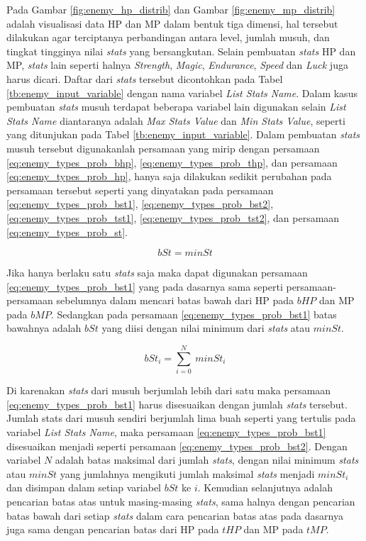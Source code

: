 Pada Gambar \ref{fig:enemy_hp_distrib} dan Gambar \ref{fig:enemy_mp_distrib} adalah visualisasi data HP dan MP dalam bentuk tiga dimensi, hal tersebut dilakukan agar terciptanya perbandingan antara level, jumlah musuh, dan tingkat tingginya nilai \textit{stats} yang bersangkutan. Selain pembuatan \textit{stats} HP dan MP, \textit{stats} lain seperti halnya \textit{Strength}, \textit{Magic}, \textit{Endurance}, \textit{Speed} dan \textit{Luck} juga harus dicari. Daftar dari \textit{stats} tersebut dicontohkan pada Tabel \ref{tb:enemy_input_variable} dengan nama variabel \textit{List Stats Name}. Dalam kasus pembuatan \textit{stats} musuh terdapat beberapa variabel lain digunakan selain \textit{List Stats Name} diantaranya adalah \textit{Max Stats Value} dan \textit{Min Stats Value}, seperti yang ditunjukan pada Tabel \ref{tb:enemy_input_variable}. Dalam pembuatan \textit{stats} musuh tersebut digunakanlah persamaan yang mirip dengan persamaan \ref{eq:enemy_types_prob_bhp}, \ref{eq:enemy_types_prob_thp}, dan persamaan \ref{eq:enemy_types_prob_hp}, hanya saja dilakukan sedikit perubahan pada persamaan tersebut seperti yang dinyatakan pada persamaan \ref{eq:enemy_types_prob_bst1}, \ref{eq:enemy_types_prob_bst2}, \ref{eq:enemy_types_prob_tst1}, \ref{eq:enemy_types_prob_tst2}, dan persamaan \ref{eq:enemy_types_prob_st}.

\begin{equation}\label{eq:enemy_types_prob_bst1}
bSt = minSt
\end{equation}

Jika hanya berlaku satu \textit{stats} saja maka dapat digunakan persamaan \ref{eq:enemy_types_prob_bst1} yang pada dasarnya sama seperti persamaan-persamaan sebelumnya dalam mencari batas bawah dari HP pada $bHP$ dan MP pada $bMP$. Sedangkan pada persamaan \ref{eq:enemy_types_prob_bst1} batas bawahnya adalah $bSt$ yang diisi dengan nilai minimum dari \textit{stats} atau $minSt$.

\begin{equation}\label{eq:enemy_types_prob_bst2}
bSt_{i} = \sum_{i=0}^{N}\ minSt_{i}
\end{equation}

Di karenakan \textit{stats} dari musuh berjumlah lebih dari satu maka persamaan \ref{eq:enemy_types_prob_bst1} harus disesuaikan dengan jumlah \textit{stats} tersebut. Jumlah stats dari musuh sendiri berjumlah lima buah seperti yang tertulis pada variabel \textit{List Stats Name}, maka persamaan \ref{eq:enemy_types_prob_bst1} disesuaikan menjadi seperti persamaan \ref{eq:enemy_types_prob_bst2}. Dengan variabel $N$ adalah batas maksimal dari jumlah \textit{stats}, dengan nilai minimum \textit{stats} atau $minSt$ yang jumlahnya mengikuti jumlah maksimal \textit{stats} menjadi $minSt_{i}$ dan disimpan dalam setiap variabel $bSt$ ke $i$. Kemudian selanjutnya adalah pencarian batas atas untuk masing-masing \textit{stats}, sama halnya dengan pencarian batas bawah dari setiap \textit{stats} dalam cara pencarian batas atas pada dasarnya juga sama dengan pencarian batas dari HP pada $tHP$ dan MP pada $tMP$.

